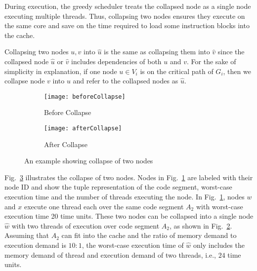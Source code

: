 During execution, the greedy scheduler treats the collapsed node as a single node executing multiple threads. Thus, collapsing two nodes ensures they execute on the same core and save on the time required to load some instruction blocks into the cache. 

Collapsing two nodes $u, v$ into $\hat{u}$ is the same as collapsing them into $\hat{v}$ since the collapsed node $\hat{u}$ or $\hat{v}$ includes dependencies of both $u$ and $v$. For the sake of simplicity in explanation, if one node $u \in V_i$ is on the critical path of $G_i$, then we collapse node $v$ into $u$ and refer to the collapsed nodes as $\hat{u}$.





\begin{figure}
  \centering
  \begin{subfigure}[b]{0.4\textwidth}{
      \texttt{[image: beforeCollapse]}
      \caption{Before Collapse}
      \label{fig:before-collapse}
    }
  \end{subfigure} \quad
  \begin{subfigure}[b]{0.4\textwidth}{
      \texttt{[image: afterCollapse]}
      \caption{After Collapse}
      \label{fig:after-collapse}
    }
  \end{subfigure}
  \caption{An example showing collapse of two nodes}
  \label{fig:dag-collapse}
\end{figure}

Fig.~\ref{fig:dag-collapse} illustrates the collapse of two nodes. Nodes in
Fig.~\ref{fig:before-collapse} are labeled with their node ID and show the tuple representation of the code segment, worst-case execution time and the number of threads executing the node. In Fig.~\ref{fig:before-collapse}, nodes $w$ and $x$ execute one thread each over the same code segment $A_2$ with worst-case execution time 20 time units. These two nodes can be collapsed into a single node $\hat{w}$ with two threads of execution over code segment $A_2$,  as shown in Fig.~\ref{fig:after-collapse}. Assuming that $A_2$ can fit into the cache and the ratio of memory demand to execution demand is $10:1$, the worst-case execution time of $\hat{w}$ only includes the memory demand of thread and execution demand of two threads, i.e., $24$ time units.

  





